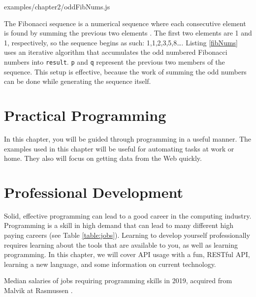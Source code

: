 \documentclass[12pt, oneside, a4paper]{book}
\begin{document}
         
         {examples/chapter2/oddFibNums.js}

         The Fibonacci sequence is a numerical sequence where each consecutive element is found by summing the previous two elements \autocite{parshallFibonacciSequence}.
         The first two elements are 1 and 1, respectively, so the sequence begins as such: 1,1,2,3,5,8\ldots.
         Listing \ref{fibNums} uses an iterative algorithm that accumulates the odd numbered Fibonacci numbers into \lstinline!result!.
         \lstinline!p! and \lstinline!q! represent the previous two members of the sequence.
         This setup is effective, because the work of summing the odd numbers can be done while generating the sequence itself.

   \chapter{Practical Programming}
   \label{chap:practical}
      In this chapter, you will be guided through programming in a useful manner.
      The examples used in this chapter will be useful for automating tasks at work or home.
      They also will focus on getting data from the Web quickly.
   \chapter{Professional Development}
   \label{chap:prof_devel}
      Solid, effective programming can lead to a good career in the computing industry.
      Programming is a skill in high demand that can lead to many different high paying careers (see Table \ref*{table:jobs}).
      Learning to develop yourself professionally requires learning about the tools that are available to you, as well as learning programming.
      In this chapter, we will cover API usage with a fun, RESTful API, learning a new language, and some information on current technology.
      \begin{table}[H]
         \caption{
            Median salaries of jobs requiring programming skills in 2019, acquired from Malvik at Rasmussen \autocite{malvikProgrammingCareersCoding}.
         }
         \label{table:jobs}
      \end{table}
\end{document}
